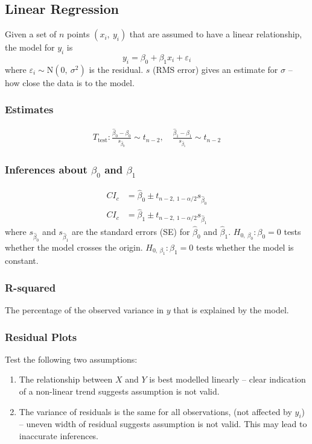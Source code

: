 \documentclass{article}
\begin{document}
\begin{multicols}{3}
    \subsection*{Linear Regression}
    Given a set of $n$ points $\left( x_i,\: y_i \right)$ that are assumed to have a linear relationship,
    the model for $y_i$ is
    \begin{equation*}
        y_i = \beta_0 + \beta_1 x_i + \varepsilon_i
    \end{equation*}
    where $\varepsilon_i \sim \mathrm{N}\left( 0,\: \sigma^2 \right)$ is the residual.
    $s$ (RMS error) gives an estimate for $\sigma$ --
    how close the data is to the model. 
    \subsubsection*{Estimates}
    \begin{align*}
        T_{\text{test}}:\frac{\hat{\beta}_0 - \beta_0}{s_{\hat{\beta}_0}} \sim t_{n-2},\quad \frac{\hat{\beta}_1 - \beta_1}{s_{\hat{\beta}_1}} \sim t_{n-2}
    \end{align*}
    \subsubsection*{Inferences about $\beta_0$ and $\beta_1$}
    \begin{align*}
        CI_c & = \hat{\beta}_0 \pm t_{n-2,\: 1-\alpha/2} s_{\hat{\beta}_0} \\
        CI_c & = \hat{\beta}_1 \pm t_{n-2,\: 1-\alpha/2} s_{\hat{\beta}_1}
    \end{align*}
    where $s_{\hat{\beta}_0}$ and $s_{\hat{\beta}_1}$ are the standard errors (SE) for $\hat{\beta}_0$ and $\hat{\beta}_1$.
    $H_{0,\:\beta_0}:\beta_0=0$ tests whether the model crosses the origin.
    $H_{0,\:\beta_1}:\beta_1=0$ tests whether the model is constant.
    \subsubsection*{R-squared}
    The percentage of the observed variance in $y$ that is explained by the model.
    \subsubsection*{Residual Plots}
    Test the following two assumptions:
    \begin{enumerate}
        \item The relationship between $X$ and $Y$ is best modelled linearly
        -- clear indication of a non-linear trend suggests assumption is not valid.
        \item The variance of residuals is the same for all observations, (not affected by $y_i$)
        -- uneven width of residual suggests assumption is not valid. 
        This may lead to inaccurate inferences.
    \end{enumerate}
\end{multicols}
\end{document}
